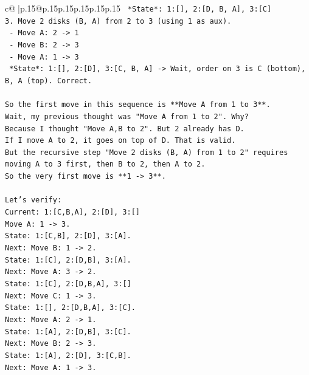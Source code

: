 \documentclass{article}
\begin{document}
{\begin{supertabular}{c@{$\;$}|p{.15\linewidth}@{}p{.15\linewidth}p{.15\linewidth}p{.15\linewidth}p{.15\linewidth}p{.15\linewidth}}
{{{\texttt{   *State*: 1:{[}{]}, 2:{[}D, B, A{]}, 3:{[}C{]}} \\
\texttt{3. Move 2 disks (B, A) from 2 to 3 (using 1 as aux).} \\
\texttt{   {-} Move A: 2 {-}> 1} \\
\texttt{   {-} Move B: 2 {-}> 3} \\
\texttt{   {-} Move A: 1 {-}> 3} \\
\texttt{   *State*: 1:{[}{]}, 2:{[}D{]}, 3:{[}C, B, A{]} {-}> Wait, order on 3 is C (bottom), B, A (top). Correct.} \\
\\ 
\texttt{So the first move in this sequence is **Move A from 1 to 3**.} \\
\texttt{Wait, my previous thought was "Move A from 1 to 2". Why?} \\
\texttt{Because I thought "Move A,B to 2". But 2 already has D.} \\
\texttt{If I move A to 2, it goes on top of D. That is valid.} \\
\texttt{But the recursive step "Move 2 disks (B, A) from 1 to 2" requires moving A to 3 first, then B to 2, then A to 2.} \\
\texttt{So the very first move is **1 {-}> 3**.} \\
\\ 
\texttt{Let's verify:} \\
\texttt{Current: 1:{[}C,B,A{]}, 2:{[}D{]}, 3:{[}{]}} \\
\texttt{Move A: 1 {-}> 3.} \\
\texttt{State: 1:{[}C,B{]}, 2:{[}D{]}, 3:{[}A{]}.} \\
\texttt{Next: Move B: 1 {-}> 2.} \\
\texttt{State: 1:{[}C{]}, 2:{[}D,B{]}, 3:{[}A{]}.} \\
\texttt{Next: Move A: 3 {-}> 2.} \\
\texttt{State: 1:{[}C{]}, 2:{[}D,B,A{]}, 3:{[}{]}} \\
\texttt{Next: Move C: 1 {-}> 3.} \\
\texttt{State: 1:{[}{]}, 2:{[}D,B,A{]}, 3:{[}C{]}.} \\
\texttt{Next: Move A: 2 {-}> 1.} \\
\texttt{State: 1:{[}A{]}, 2:{[}D,B{]}, 3:{[}C{]}.} \\
\texttt{Next: Move B: 2 {-}> 3.} \\
\texttt{State: 1:{[}A{]}, 2:{[}D{]}, 3:{[}C,B{]}.} \\
\texttt{Next: Move A: 1 {-}> 3.} \\
}}}
\end{supertabular}}
\end{document}
